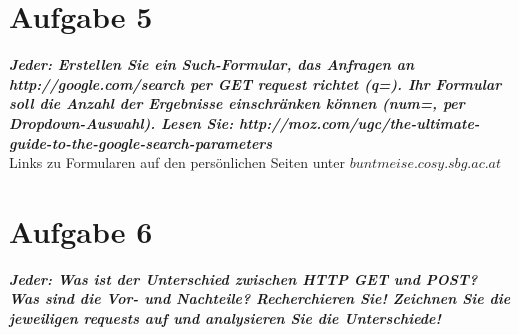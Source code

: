 \documentclass[12pt, a4paper]{report}
\begin{document}
\section*{Aufgabe 5}
\textbf{\textit{Jeder: Erstellen Sie ein Such-Formular, das Anfragen an http://google.com/search
per GET request richtet (q=). Ihr Formular soll die Anzahl der Ergebnisse einschränken
können (num=, per Dropdown-Auswahl).
Lesen Sie: http://moz.com/ugc/the-ultimate-guide-to-the-google-search-parameters}}\\
Links zu Formularen auf den persönlichen Seiten unter $buntmeise.cosy.sbg.ac.at$

\section*{Aufgabe 6}
\textbf{\textit{Jeder: Was ist der Unterschied zwischen HTTP GET und POST? Was sind die Vor- und
Nachteile? Recherchieren Sie! Zeichnen Sie die jeweiligen requests auf und analysieren
Sie die Unterschiede!}}
\end{document}
